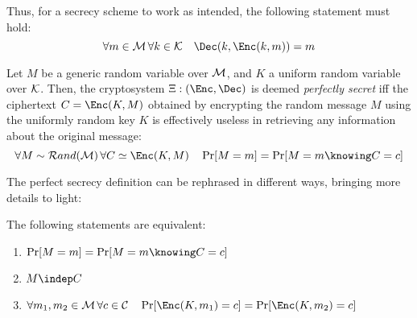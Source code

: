 Thus, for a secrecy scheme to work as intended, the following statement must hold:
\[
    \forall m \in \M \, \forall k \in \K \quad \Dec(k, \Enc(k, m)) = m
\]

\begin{definition}
    Let $M$ be a generic random variable over $\mathcal{M}$, and $K$ a uniform random variable over $\mathcal{K}$. Then, the cryptosystem $\Xi: (\Enc, \Dec)$ is deemed \emph{perfectly secret} iff the ciphertext $C = \Enc(K, M)$ obtained by encrypting the random message $M$ using the uniformly random key $K$ is effectively useless in retrieving any information about the original message:
    \[
        \forall M \sim \mathcal{R}and(\M) \, \forall C \simeq \Enc(K, M) \quad \Pr[M = m] = \Pr[M = m \knowing C = c]
    \]
\end{definition}

The perfect secrecy definition can be rephrased in different ways, bringing more details to light:
    
\begin{proposition}
    The following statements are equivalent:
    \begin{enumerate}
        \item \label{def:ps1} $\Pr[M = m] = \Pr[M = m \knowing C = c]$
        \item \label{def:ps2} $M \indep C$
        \item \label{def:ps3} $\forall m_1, m_2 \in \M \, \forall c \in \C \quad \Pr[\Enc(K, m_1) = c] = \Pr[\Enc(K, m_2) = c]$
    \end{enumerate}
\end{proposition}

